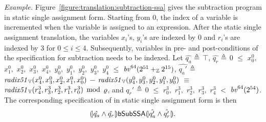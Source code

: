 \noindent
\emph{Example.}
Figure~\ref{figure:translation:subtraction-ssa} gives the subtraction program
 in static single assignment form. Starting from $0$, the
index of a variable is incremented when the variable is assigned to an
expression. After the static single assignment translation, the
variables ${x}_i$'s, ${y}_i$'s are indexed by $0$ and
${r}_i$'s are indexed by $3$ for $0 \leq i \leq 4$.
Subsequently, variables in pre- and post-conditions of the
specification for subtraction needs to be indexed.
Let $\hat{q_a}$ $\defn$ $\top$, $\hat{q_r}$ $\defn$ $0$ $\leq$ ${x}^0_0,$ ${x}^0_1,$ ${x}^0_2,$ ${x}^0_3,$ ${x}^0_4,$ ${y}^0_0,$ ${y}^0_1,$ ${y}^0_2,$ ${y}^0_3,$ ${y}^0_4$ $\leq$ $\bv^{64}(2^{51} +_\bbfZ 2^{15})$, $\hat{q_a'}$ $\defn$ $\mathit{radix51}_\BV({x}^0_4, {x}^0_3, {x}^0_2, {x}^0_1, {x}^0_0)$ $-$ $\mathit{radix51}_\BV({y}^0_4, {y}^0_3, {y}^0_2, {y}^0_1, {y}^0_0)$ $\equiv$ $\mathit{radix51}_\BV({r}^3_4, {r}^3_3, {r}^3_2, {r}^3_1, {r}^3_0)$ $\mod$ $\myprime$, and $q_r'$ $\defn$ $0$ $\leq$ ${r}^3_0,$ ${r}^3_1,$ ${r}^3_2,$ ${r}^3_3,$ ${r}^3_4$ $<$ $\bv^{64}(2^{54})$.
The corresponding specification of in static single assignment form is then
\[
\cond{\hat{q_a} \wedge \hat{q_r}} \dslcode{bSubSSA} \cond{\hat{q_a'} \wedge \hat{q_r'}}.
\]

